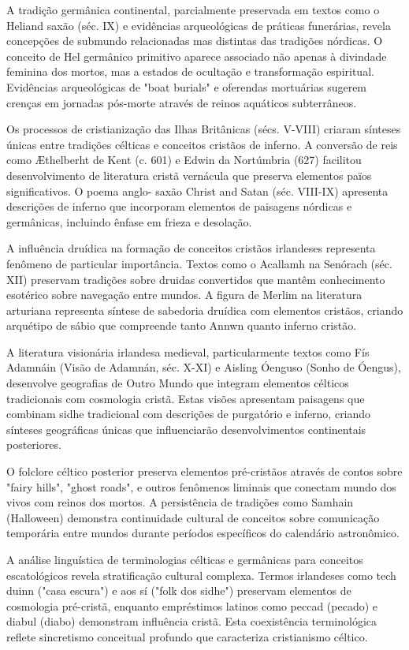 A tradição germânica continental, parcialmente preservada em textos como o Heliand saxão (séc. IX) e evidências arqueológicas de práticas funerárias, revela concepções de submundo relacionadas mas distintas das tradições nórdicas. O conceito de Hel germânico primitivo aparece associado não apenas à divindade feminina dos mortos, mas a estados de ocultação e transformação espiritual. Evidências arqueológicas de "boat burials" e oferendas mortuárias sugerem crenças em jornadas pós-morte através de reinos aquáticos subterrâneos.

Os processos de cristianização das Ilhas Britânicas (sécs. V-VIII) criaram sínteses únicas entre tradições célticas e conceitos cristãos de inferno. A conversão de reis como Æthelberht de Kent (c. 601) e Edwin da Nortúmbria (627) facilitou desenvolvimento de literatura cristã vernácula que preserva elementos païos significativos. O poema anglo- saxão Christ and Satan (séc. VIII-IX) apresenta descrições de inferno que incorporam elementos de paisagens nórdicas e germânicas, incluindo ênfase em frieza e desolação.

A influência druídica na formação de conceitos cristãos irlandeses representa fenômeno de particular importância. Textos como o Acallamh na Senórach (séc. XII) preservam tradições sobre druidas convertidos que mantêm conhecimento esotérico sobre navegação entre mundos. A figura de Merlim na literatura arturiana representa síntese de sabedoria druídica com elementos cristãos, criando arquétipo de sábio que compreende tanto Annwn quanto inferno cristão.

A literatura visionária irlandesa medieval, particularmente textos como Fís Adamnáin (Visão de Adamnán, séc. X-XI) e Aisling Óenguso (Sonho de Óengus), desenvolve geografias de Outro Mundo que integram elementos célticos tradicionais com cosmologia cristã. Estas visões apresentam paisagens que combinam sidhe tradicional com descrições de purgatório e inferno, criando sínteses geográficas únicas que influenciarão desenvolvimentos continentais posteriores.

O folclore céltico posterior preserva elementos pré-cristãos através de contos sobre "fairy hills", "ghost roads", e outros fenômenos liminais que conectam mundo dos vivos com reinos dos mortos. A persistência de tradições como Samhain (Halloween) demonstra continuidade cultural de conceitos sobre comunicação temporária entre mundos durante períodos específicos do calendário astronômico.

A análise linguística de terminologias célticas e germânicas para conceitos escatológicos revela stratificação cultural complexa. Termos irlandeses como tech duinn ("casa escura") e aos sí ("folk dos sidhe") preservam elementos de cosmologia pré-cristã, enquanto empréstimos latinos como peccad (pecado) e diabul (diabo) demonstram influência cristã. Esta coexistência terminológica reflete sincretismo conceitual profundo que caracteriza cristianismo céltico.



